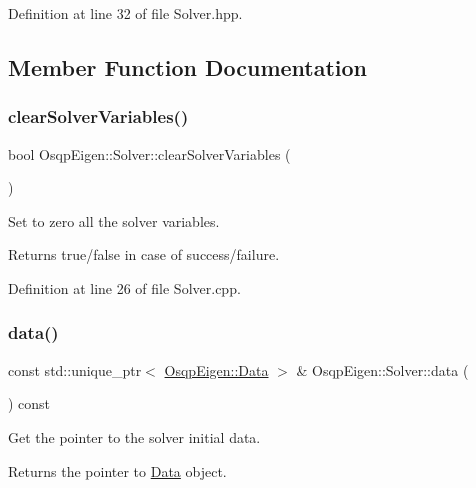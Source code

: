 Definition at line 32 of file Solver.\+hpp.



\subsection{Member Function Documentation}
\mbox{\label{classOsqpEigen_1_1Solver_a11605685ef645c991b1f7935d1b854f4}} 
\subsubsection{\texorpdfstring{clear\+Solver\+Variables()}{clearSolverVariables()}}
{\footnotesize\ttfamily bool Osqp\+Eigen\+::\+Solver\+::clear\+Solver\+Variables (\begin{DoxyParamCaption}{ }\end{DoxyParamCaption})}



Set to zero all the solver variables. 

\begin{DoxyReturn}{Returns}
true/false in case of success/failure. 
\end{DoxyReturn}


Definition at line 26 of file Solver.\+cpp.

\mbox{\label{classOsqpEigen_1_1Solver_a2d93b3aae416bc29abe5fb1db16333e0}} 
\subsubsection{\texorpdfstring{data()}{data()}}
{\footnotesize\ttfamily const std\+::unique\+\_\+ptr$<$ \mbox{\hyperlink{classOsqpEigen_1_1Data}{Osqp\+Eigen\+::\+Data}} $>$ \& Osqp\+Eigen\+::\+Solver\+::data (\begin{DoxyParamCaption}{ }\end{DoxyParamCaption}) const}



Get the pointer to the solver initial data. 

\begin{DoxyReturn}{Returns}
the pointer to \mbox{\hyperlink{classOsqpEigen_1_1Data}{Data}} object. 
\end{DoxyReturn}



